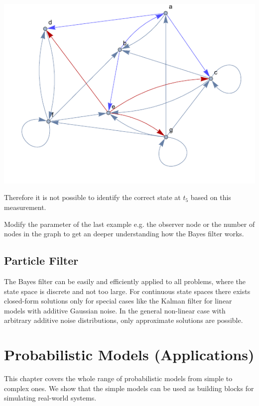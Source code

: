 \documentclass{tstextbook}
\begin{document}
\begin{example}
\includegraphics[scale=0.8, center]{images/highlighted_graph_world.pdf}

Therefore it is not possible to identify the correct state at $t_5$ based on this measurement.   

\end{example}

\begin{exercise}
Modify the parameter of the last example e.g. the observer node or the number of nodes in the graph to get an deeper understanding how the Bayes filter works.
\end{exercise}

\section{Particle Filter}
\label{se:particle_filter}

The Bayes filter can be easily and efficiently applied to all problems, where the state space is discrete and not too large. For continuous state spaces there exists closed-form solutions only for special cases like the Kalman filter for linear models with additive Gaussian noise. In the general non-linear case with arbitrary additive noise distributions, only approximate solutions are possible. 

\chapter{Probabilistic Models (Applications)}

\begin{summary}
  This chapter covers the whole range of probabilistic models from simple to complex ones. We show that the simple models can be used as building blocks for simulating real-world systems.
\end{summary}
\end{document}
